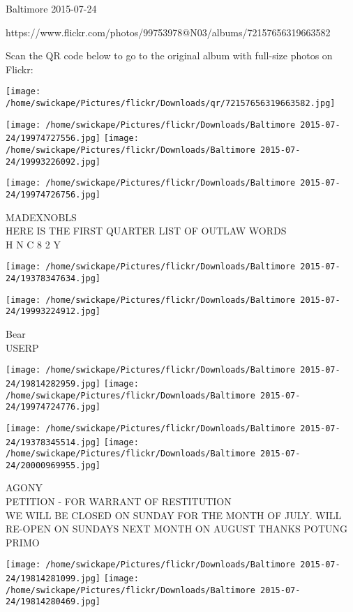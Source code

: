 \documentclass[10pt,letterpaper]{article}
\begin{document}
Baltimore 2015-07-24

https://www.flickr.com/photos/99753978@N03/albums/72157656319663582

Scan the QR code below to go to the original album with full-size photos on Flickr:

\texttt{[image: /home/swickape/Pictures/flickr/Downloads/qr/72157656319663582.jpg]}
\pagebreak

\texttt{[image: /home/swickape/Pictures/flickr/Downloads/Baltimore 2015-07-24/19974727556.jpg]}
\texttt{[image: /home/swickape/Pictures/flickr/Downloads/Baltimore 2015-07-24/19993226092.jpg]}

\texttt{[image: /home/swickape/Pictures/flickr/Downloads/Baltimore 2015-07-24/19974726756.jpg]}

MADEXNOBLS\\
HERE IS THE FIRST QUARTER LIST OF OUTLAW WORDS\\
H N C 8 2 Y
\pagebreak

\texttt{[image: /home/swickape/Pictures/flickr/Downloads/Baltimore 2015-07-24/19378347634.jpg]}

\vspace{0.25in}
\texttt{[image: /home/swickape/Pictures/flickr/Downloads/Baltimore 2015-07-24/19993224912.jpg]}

Bear\\
USERP
\pagebreak

\texttt{[image: /home/swickape/Pictures/flickr/Downloads/Baltimore 2015-07-24/19814282959.jpg]}
\texttt{[image: /home/swickape/Pictures/flickr/Downloads/Baltimore 2015-07-24/19974724776.jpg]}

\texttt{[image: /home/swickape/Pictures/flickr/Downloads/Baltimore 2015-07-24/19378345514.jpg]}
\texttt{[image: /home/swickape/Pictures/flickr/Downloads/Baltimore 2015-07-24/20000969955.jpg]}

AGONY\\
PETITION {-} FOR WARRANT OF RESTITUTION\\
WE WILL BE CLOSED ON SUNDAY FOR THE MONTH OF JULY.  WILL RE{-}OPEN ON SUNDAYS NEXT MONTH ON AUGUST THANKS POTUNG\\
PRIMO
\pagebreak

\texttt{[image: /home/swickape/Pictures/flickr/Downloads/Baltimore 2015-07-24/19814281099.jpg]}
\texttt{[image: /home/swickape/Pictures/flickr/Downloads/Baltimore 2015-07-24/19814280469.jpg]}
\end{document}
